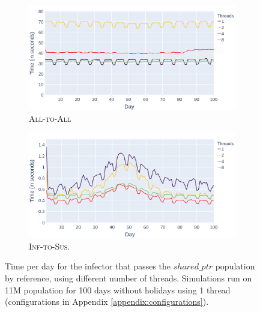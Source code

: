 \begin{figure}
    \centering
    \begin{subfigure}[b]{\linewidth}
        \centering
        \includegraphics[width=\linewidth]{3 - Stride/fig/standard_all_parallel_infector.png}
        \caption{\textsc{All-to-All}}
        \label{fig:standard_all_parallel_infector}
    \end{subfigure}
    \begin{subfigure}[b]{\linewidth}
        \centering
        \includegraphics[width=\linewidth]{3 - Stride/fig/standard_opt_parallel_infector.png}
        \caption{\textsc{Inf-to-Sus}.}
        \label{fig:standard_opt_parallel_infector}
    \end{subfigure}
    \caption{Time per day for the infector that passes the $shared\_ptr$ population by reference, using different number of threads. Simulations run on 11M population for 100 days without holidays using 1 thread (configurations in Appendix \ref{appendix:configurations}).}
    \label{fig:standard_parallel_infector}
\end{figure}

